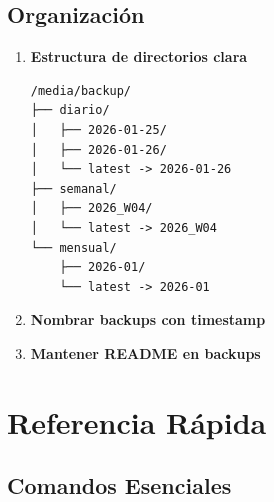 \documentclass[
  doc,
  floatsintext,
  longtable,
  a4paper,
  nolmodern,
  notxfonts,
  notimes,
  12pt,
  colorlinks=true,linkcolor=blue,citecolor=blue,urlcolor=blue]{apa7}
\newenvironment{Shaded}{\begin{snugshade}}{\end{snugshade}}
\newcommand{\ExtensionTok}[1]{\textcolor[rgb]{0.00,0.23,0.31}{#1}}
\newcommand{\FunctionTok}[1]{\textcolor[rgb]{0.28,0.35,0.67}{#1}}
\newcommand{\NormalTok}[1]{\textcolor[rgb]{0.00,0.23,0.31}{#1}}
\newcommand{\OperatorTok}[1]{\textcolor[rgb]{0.37,0.37,0.37}{#1}}
\newcommand{\StringTok}[1]{\textcolor[rgb]{0.13,0.47,0.30}{#1}}
\newcommand{\VariableTok}[1]{\textcolor[rgb]{0.07,0.07,0.07}{#1}}
\begin{document}
\subsection{Organización}\label{organizaciuxf3n}

\begin{enumerate}
\def\labelenumi{\arabic{enumi}.}
\item
  \textbf{Estructura de directorios clara}

\begin{verbatim}
/media/backup/
├── diario/
│   ├── 2026-01-25/
│   ├── 2026-01-26/
│   └── latest -> 2026-01-26
├── semanal/
│   ├── 2026_W04/
│   └── latest -> 2026_W04
└── mensual/
    ├── 2026-01/
    └── latest -> 2026-01
\end{verbatim}
\item
  \textbf{Nombrar backups con timestamp}

\begin{Shaded}
\end{Shaded}
\item
  \textbf{Mantener README en backups}

\begin{Shaded}
\end{Shaded}
\end{enumerate}

\section{Referencia Rápida}\label{referencia-ruxe1pida}

\subsection{Comandos Esenciales}\label{comandos-esenciales}
\end{document}
